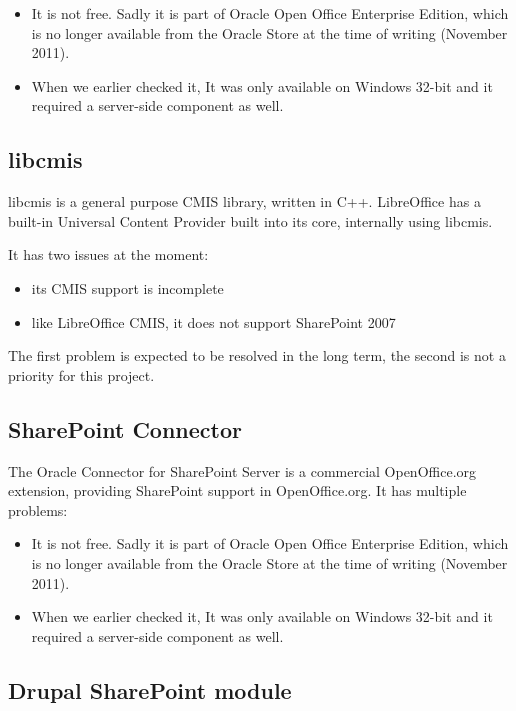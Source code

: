\begin{itemize}
\item It is not free. Sadly it is part of Oracle Open Office Enterprise
Edition, which is no longer available from the Oracle Store at the time of
writing (November 2011).
\item When we earlier checked it, It was only available on Windows 32-bit and it
required a server-side component as well.
\end{itemize}

\subsection*{libcmis}
libcmis \cite{libcmis} is a general purpose CMIS library, written in C++.
LibreOffice has a built-in Universal Content Provider built into its core,
internally using libcmis.

It has two issues at the moment:

\begin{itemize}
\item its CMIS support is incomplete
\item like LibreOffice CMIS, it does not support SharePoint 2007
\end{itemize}

The first problem is expected to be resolved in the long term, the second is
not a priority for this project.

\subsection*{SharePoint Connector}
The Oracle Connector for SharePoint Server \cite{oracle-sp-connector} is a
commercial OpenOffice.org extension, providing SharePoint support in
OpenOffice.org. It has multiple problems:

\begin{itemize}
\item It is not free. Sadly it is part of Oracle Open Office Enterprise
Edition, which is no longer available from the Oracle Store at the time of
writing (November 2011).
\item When we earlier checked it, It was only available on Windows 32-bit and it
required a server-side component as well.
\end{itemize}

\subsection*{Drupal SharePoint module}

